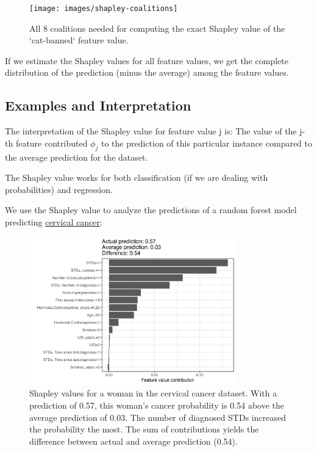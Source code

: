 \documentclass[
  11pt,
]{scrbook}
\begin{document}
\begin{figure}

{\centering \texttt{[image: images/shapley-coalitions]} 

}

\caption{All 8 coalitions needed for computing the exact Shapley value of the `cat-banned` feature value.}\label{fig:shapley-coalitions}
\end{figure}

If we estimate the Shapley values for all feature values, we get the complete distribution of the prediction (minus the average) among the feature values.

\hypertarget{examples-and-interpretation}{%
\subsection{Examples and Interpretation}\label{examples-and-interpretation}}

The interpretation of the Shapley value for feature value j is:
The value of the j-th feature contributed \(\phi_j\) to the prediction of this particular instance compared to the average prediction for the dataset.

The Shapley value works for both classification (if we are dealing with probabilities) and regression.

We use the Shapley value to analyze the predictions of a random forest model predicting \protect\hyperlink{cervical}{cervical cancer}:

\begin{figure}

{\centering \includegraphics[width=0.8\textwidth]{images/shapley-cervical-plot-1} 

}

\caption{Shapley values for a woman in the cervical cancer dataset. With a prediction of 0.57, this woman's cancer probability is 0.54 above the average prediction of 0.03. The number of diagnosed STDs increased the probability the most. The sum of contributions yields the difference between actual and average prediction (0.54).}\label{fig:shapley-cervical-plot}
\end{figure}
\end{document}
